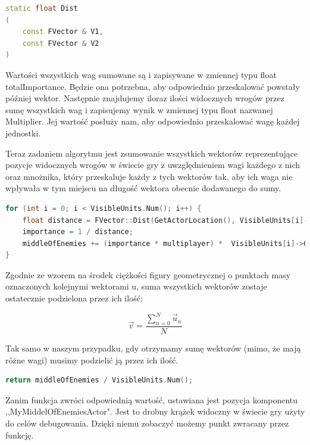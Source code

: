 \documentclass[12pt]{report}
\begin{document}
\begin{lstlisting}[language=C++, backgroundcolor=\color{black!5}, basicstyle=\footnotesize, caption=Deklaracja funkcji Dist() w klasie FVector]
static float Dist
(
    const FVector & V1,
    const FVector & V2
)
\end{lstlisting}
Wartości wszystkich wag sumowane są i zapisywane w zmiennej typu float totalImportance. Będzie ona potrzebna, aby odpowiednio przeskalować powstały później wektor. Następnie znajdujemy iloraz ilości widocznych wrogów przez sumę wszystkich wag i zapisujemy wynik w zmiennej typu float nazwanej Multiplier. Jej wartość posłuży nam, aby odpowiednio przeskalować wagę każdej jednostki.

Teraz zadaniem algorytmu jest zsumowanie wszystkich wektorów reprezentujące pozycje widocznych wrogów w świecie gry z uwzględnieniem wagi każdego z nich oraz mnożnika, który przeskaluje każdy z tych wektorów tak, aby ich waga nie wpływała w tym miejscu na długość wektora obecnie dodawanego do sumy.
\begin{lstlisting}[language=C++, backgroundcolor=\color{black!5}, basicstyle=\footnotesize, caption=Pętla sumująca wektory pozycji wrogów z uwzględnieniem ich wag]
for (int i = 0; i < VisibleUnits.Num(); i++) {
    float distance = FVector::Dist(GetActorLocation(), VisibleUnits[i]->GetActorLocation());
	importance = 1 / distance;
	middleOfEnemies += (importance * multiplayer) *  VisibleUnits[i]->GetActorLocation();
}
\end{lstlisting}

Zgodnie ze wzorem na środek ciężkości figury geometrycznej o punktach masy oznaczonych kolejnymi wektorami u, suma wszystkich wektorów zostaje ostatecznie podzielona przez ich ilość:

$$\vec v = \dfrac{\sum_{n=0}^{N}  \vec u_n}{N}   $$

Tak samo w naszym przypadku, gdy otrzymamy sumę wektorów (mimo, że mają różne wagi) musimy podzielić ją przez ich ilość.
\begin{lstlisting}[language=C++, backgroundcolor=\color{black!5}, basicstyle=\footnotesize, caption=Wartość zwracana funkcji GetMiddleOfEnemies();]
return middleOfEnemies / VisibleUnits.Num();
\end{lstlisting}

Zanim funkcja zwróci odpowiednią wartość, ustawiana jest pozycja komponentu ,,MyMiddelOfEnemiesActor". Jest to drobny krążek widoczny w świecie gry użyty do celów debugowania. Dzięki niemu zobaczyć możemy punkt zwracany przez funkcję.
\end{document}
